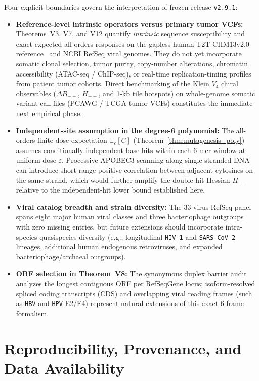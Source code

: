 \documentclass[11pt, a4paper]{article}
\DeclareRobustCommand{\_}{\textunderscore\allowbreak}
\begin{document}
Four explicit boundaries govern the interpretation of frozen release \texttt{v2.9.1}:
\begin{itemize}
    \item \textbf{Reference-level intrinsic operators versus primary tumor VCFs:} Theorems~V3, V7, and V12 quantify \emph{intrinsic} sequence susceptibility and exact expected all-orders responses on the gapless human T2T-CHM13v2.0 reference~\cite{nurk2022} and NCBI RefSeq viral genomes. They do not yet incorporate somatic clonal selection, tumor purity, copy-number alterations, chromatin accessibility (ATAC-seq / ChIP-seq), or real-time replication-timing profiles from patient tumor cohorts. Direct benchmarking of the Klein $V_4$ chiral observables ($\Delta B_{--}$, $H_{--}$, and 1-kb tile hotspots) on whole-genome somatic variant call files (PCAWG / TCGA tumor VCFs) constitutes the immediate next empirical phase.
    \item \textbf{Independent-site assumption in the degree-6 polynomial:} The all-orders finite-dose expectation $\mathbb{E}_\varepsilon[C]$ (Theorem~\ref{thm:mutagenesis_poly}) assumes conditionally independent base hits within each 6-mer window at uniform dose $\varepsilon$. Processive APOBEC3 scanning along single-stranded DNA can introduce short-range positive correlation between adjacent cytosines on the same strand, which would further amplify the double-hit Hessian $H_{--}$ relative to the independent-hit lower bound established here.
    \item \textbf{Viral catalog breadth and strain diversity:} The 33-virus RefSeq panel spans eight major human viral classes and three bacteriophage outgroups with zero missing entries, but future extensions should incorporate intra-species quasispecies diversity (e.g., longitudinal \texttt{HIV-1} and \texttt{SARS-CoV-2} lineages, additional human endogenous retroviruses, and expanded bacteriophage/archaeal outgroups).
    \item \textbf{ORF selection in Theorem~V8:} The synonymous duplex barrier audit analyzes the longest contiguous ORF per RefSeqGene locus; isoform-resolved spliced coding transcripts (CDS) and overlapping viral reading frames (such as \texttt{HBV} and \texttt{HPV} E2/E4) represent natural extensions of this exact 6-frame formalism.
\end{itemize}

\section{Reproducibility, Provenance, and Data Availability}
\label{sec:reproducibility}
\end{document}
